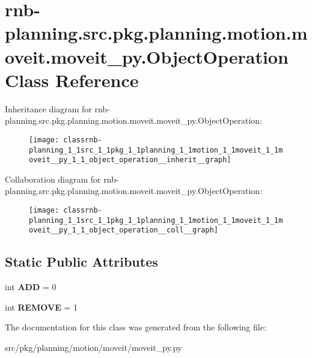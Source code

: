 \hypertarget{classrnb-planning_1_1src_1_1pkg_1_1planning_1_1motion_1_1moveit_1_1moveit__py_1_1_object_operation}{}\section{rnb-\/planning.src.\+pkg.\+planning.\+motion.\+moveit.\+moveit\+\_\+py.\+Object\+Operation Class Reference}
\label{classrnb-planning_1_1src_1_1pkg_1_1planning_1_1motion_1_1moveit_1_1moveit__py_1_1_object_operation}


Inheritance diagram for rnb-\/planning.src.\+pkg.\+planning.\+motion.\+moveit.\+moveit\+\_\+py.\+Object\+Operation\+:\nopagebreak
\begin{figure}[H]
\begin{center}
\leavevmode
\texttt{[image: classrnb-planning\_1\_1src\_1\_1pkg\_1\_1planning\_1\_1motion\_1\_1moveit\_1\_1moveit\_\_py\_1\_1\_object\_operation\_\_inherit\_\_graph]}
\end{center}
\end{figure}


Collaboration diagram for rnb-\/planning.src.\+pkg.\+planning.\+motion.\+moveit.\+moveit\+\_\+py.\+Object\+Operation\+:\nopagebreak
\begin{figure}[H]
\begin{center}
\leavevmode
\texttt{[image: classrnb-planning\_1\_1src\_1\_1pkg\_1\_1planning\_1\_1motion\_1\_1moveit\_1\_1moveit\_\_py\_1\_1\_object\_operation\_\_coll\_\_graph]}
\end{center}
\end{figure}
\subsection*{Static Public Attributes}
\begin{DoxyCompactItemize}
\item 
\mbox{\label{classrnb-planning_1_1src_1_1pkg_1_1planning_1_1motion_1_1moveit_1_1moveit__py_1_1_object_operation_ac329813786da38dcaf163df4d7cf222d}} 
int {\bfseries A\+DD} = 0
\item 
\mbox{\label{classrnb-planning_1_1src_1_1pkg_1_1planning_1_1motion_1_1moveit_1_1moveit__py_1_1_object_operation_a08b1eae9683ee48314d37bca99ff4886}} 
int {\bfseries R\+E\+M\+O\+VE} = 1
\end{DoxyCompactItemize}


The documentation for this class was generated from the following file\+:\begin{DoxyCompactItemize}
\item 
src/pkg/planning/motion/moveit/moveit\+\_\+py.\+py\end{DoxyCompactItemize}
